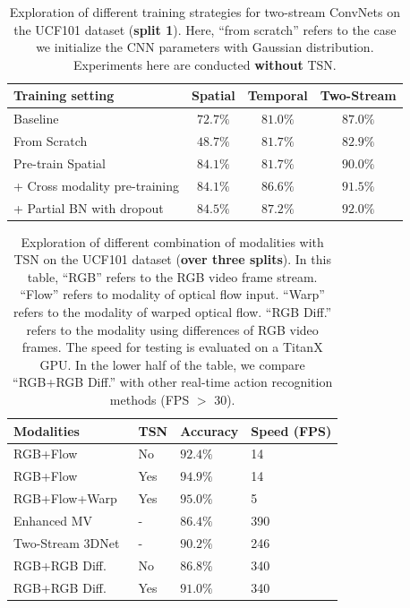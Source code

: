 \documentclass[10pt,journal,compsoc]{IEEEtran}
\begin{document}
\begin{table}[t]
  \begin{center}
    \caption{Exploration of different training strategies for two-stream ConvNets on the UCF101 dataset ({\bf split 1}). Here, ``from scratch'' refers to the case we initialize the CNN parameters with Gaussian distribution. Experiments here are conducted \textbf{without} TSN.}
    \label{tbl:learning}
    \vspace{-10pt}
    \begin{tabular}{|l|c|c|c|}
      \hline
      Training setting & Spatial  & Temporal & Two-Stream \\
      \hline 
      Baseline~\cite{SimonyanZ14} & $ 72.7\% $ & $ 81.0\% $ & $  87.0\%  $\\
      \hline
      From Scratch  &  $ 48.7\% $ &  $ 81.7\% $ & $ 82.9\% $ \\
      \hline
      Pre-train Spatial  & $ 84.1\% $ &  $ 81.7\% $ & $ 90.0\% $ \\
      \hline
      + Cross modality pre-training  & $ 84.1\% $ &  $ 86.6\% $ & $ 91.5\% $ \\
      \hline
      + Partial BN with dropout & $ 84.5 \% $ & $ 87.2\% $ & $ 92.0\% $ \\
      \hline
    \end{tabular}
    \vspace{-10pt}
  \end{center}
\end{table}


\begin{table}[]
	\centering
	\caption{Exploration of different combination of modalities with TSN on the UCF101 dataset ({\bf over three splits}). In this table, ``RGB'' refers to the RGB video frame stream. ``Flow'' refers to modality of optical flow input. ``Warp'' refers to the modality of warped optical flow. ``RGB Diff.'' refers to the modality using differences of RGB video frames. The speed for testing is evaluated on a TitanX GPU. In the lower half of the table, we compare ``RGB+RGB Diff.'' with other real-time action recognition methods (FPS $>$ 30).}
  \vspace{-10pt}
	\label{tbl:modality_speed}
	\begin{tabular}{|l|l|l|l|}
		\hline
		Modalities       & TSN & Accuracy & Speed (FPS) \\ \hline
		RGB+Flow         & No   & $92.4\%$ & 14          \\ \hline
		RGB+Flow         & Yes  & $94.9\%$ & 14          \\ \hline
		RGB+Flow+Warp    & Yes  & $95.0\%$ & 5           \\ \hline\hline
		Enhanced MV~\cite{ZhangWWQW16}      & -    & $86.4\%$ & 390         \\ \hline
		Two-Stream 3DNet~\cite{DibaPV2016} & -    & $90.2\%$ & 246         \\ \hline
		RGB+RGB Diff.    & No   & $86.8\%$ & 340         \\ \hline
		RGB+RGB Diff.    & Yes  & $91.0\%$ & 340         \\ \hline
	\end{tabular}
  \vspace{-10pt}
\end{table}
\end{document}

